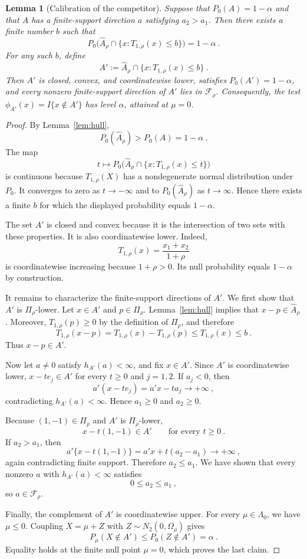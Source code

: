 \documentclass[12pt]{article}
\newtheorem{lemma}{Lemma}
\theoremstyle{remark}
\begin{document}
\begin{lemma}[Calibration of the competitor]\label{lem:competitor}
Suppose that $P_0(A)=1-\alpha$ and that $A$ has a finite-support direction
$a$ satisfying $a_2>a_1$.  Then there exists a finite number $b$ such that
\[
P_0\bigl(\widehat A_\rho
\cap\{x:T_{1,\rho}(x)\le b\}\bigr)=1-\alpha~.
\]
For any such $b$, define
\[
A':=\widehat A_\rho\cap\{x:T_{1,\rho}(x)\le b\}~.
\]
Then $A'$ is closed, convex, and coordinatewise lower, satisfies
$P_0(A')=1-\alpha$, and every nonzero finite-support direction of $A'$ lies in
$\mathcal F_\rho$.  Consequently, the test
$\phi_{A'}(x)=I\{x\notin A'\}$ has level $\alpha$, attained at $\mu=0$.
\end{lemma}

\begin{proof}
By Lemma~\ref{lem:hull},
\[
P_0(\widehat A_\rho)>P_0(A)=1-\alpha~.
\]
The map
\[
t\longmapsto
P_0\bigl(\widehat A_\rho
\cap\{x:T_{1,\rho}(x)\le t\}\bigr)
\]
is continuous because $T_{1,\rho}(X)$ has a nondegenerate normal distribution
under $P_0$.  It converges to zero as $t\to-\infty$ and to
$P_0(\widehat A_\rho)$ as $t\to\infty$.  Hence there exists a finite $b$ for
which the displayed probability equals $1-\alpha$.

The set $A'$ is closed and convex because it is the intersection of two sets
with these properties.  It is also coordinatewise lower.  Indeed,
\[
T_{1,\rho}(x)=\frac{x_1+x_2}{1+\rho}
\]
is coordinatewise increasing because $1+\rho>0$.  Its null probability equals
$1-\alpha$ by construction.

It remains to characterize the finite-support directions of $A'$.  We first
show that $A'$ is $\Pi_\rho$-lower.  Let $x\in A'$ and $p\in\Pi_\rho$.
Lemma~\ref{lem:hull} implies that $x-p\in\widehat A_\rho$.  Moreover,
$T_{1,\rho}(p)\ge0$ by the definition of $\Pi_\rho$, and therefore
\[
T_{1,\rho}(x-p)
=T_{1,\rho}(x)-T_{1,\rho}(p)
\le T_{1,\rho}(x)
\le b~.
\]
Thus $x-p\in A'$.

Now let $a\ne0$ satisfy $h_{A'}(a)<\infty$, and fix $x\in A'$.  Since $A'$ is
coordinatewise lower, $x-te_j\in A'$ for every $t\ge0$ and $j=1,2$.  If
$a_j<0$, then
\[
a'(x-te_j)=a'x-ta_j\longrightarrow+\infty~,
\]
contradicting $h_{A'}(a)<\infty$.  Hence $a_1\ge0$ and $a_2\ge0$.

Because $(1,-1)\in\Pi_\rho$ and $A'$ is $\Pi_\rho$-lower,
\[
x-t(1,-1)\in A'
\qquad\text{for every }t\ge0~.
\]
If $a_2>a_1$, then
\[
a'\{x-t(1,-1)\}
=a'x+t(a_2-a_1)
\longrightarrow+\infty~,
\]
again contradicting finite support.  Therefore $a_2\le a_1$.  We have shown
that every nonzero $a$ with $h_{A'}(a)<\infty$ satisfies
\[
0\le a_2\le a_1~,
\]
so $a\in\mathcal F_\rho$.

Finally, the complement of $A'$ is coordinatewise upper.  For every
$\mu\in\Lambda_0$, we have $\mu\le0$.  Coupling $X=\mu+Z$ with
$Z\sim N_2(0,\Omega_\rho)$ gives
\[
P_\mu(X\notin A')\le P_0(Z\notin A')=\alpha~.
\]
Equality holds at the finite null point $\mu=0$, which proves the last claim.
\end{proof}
\end{document}
